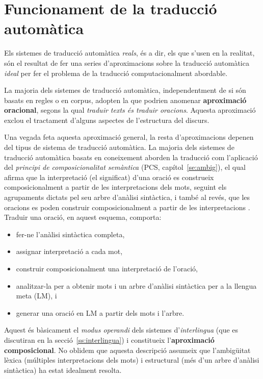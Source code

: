 \section{Funcionament de la traducció automàtica}
\label{se:aprox}

Els sistemes de traducció automàtica \emph{reals}, és a dir, els que
s'usen en la realitat, són el resultat de fer una series
d'aproximacions sobre la traducció automàtica \emph{ideal} per fer el
problema de la traducció computacionalment abordable.

La majoria dels sistemes de traducció automàtica, independentment de
si són basats en regles o en corpus, adopten la que podrien anomenar
\textbf{aproximació oracional}, segons la qual \emph{traduir texts és
  traduir oracions}. Aquesta aproximació exclou el tractament d'alguns
aspectes de l'estructura del discurs.

Una vegada feta aquesta aproximació general, la resta d'aproximacions
depenen del tipus de sistema de traducció automàtica. La majoria dels
sistemes de traducció automàtica basats en coneixement aborden la
traducció com l'aplicació del \emph{principi de composicionalitat
  semàntica} (PCS, capítol~\ref{se:ambig}), el qual afirma que la
interpretació (el significat) d'una oració es construeix
composicionalment a partir de les interpretacions dels mots, seguint
els agrupaments dictats pel seu arbre d'anàlisi sintàctica, i també al
revés, que les oracions es poden construir composicionalment a partir
de les interpretacions \citep{tellier00p}. Traduir una oració, en
aquest esquema, comporta:
\begin{itemize}
\item fer-ne l'anàlisi sintàctica completa,
\item assignar interpretació a cada mot,
\item construir composicionalment una interpretació de l'oració,
\item analitzar-la per a obtenir mots i un arbre d'anàlisi sintàctica
  per a la llengua meta (LM), i
\item generar una oració en LM a partir dels mots i l'arbre.
\end{itemize}
Aquest és bàsicament el \emph{modus operandi} dels sistemes
d'\emph{interlingua} (que es discutiran en la
secció~\ref{ss:interlingua}) i constitueix l'\textbf{aproximació
  composicional}. No oblidem que aquesta descripció assumeix que
l'ambigüitat lèxica (múltiples interpretacions dels mots) i
estructural (més d'un arbre d'anàlisi sintàctica) ha estat idealment
resolta.

